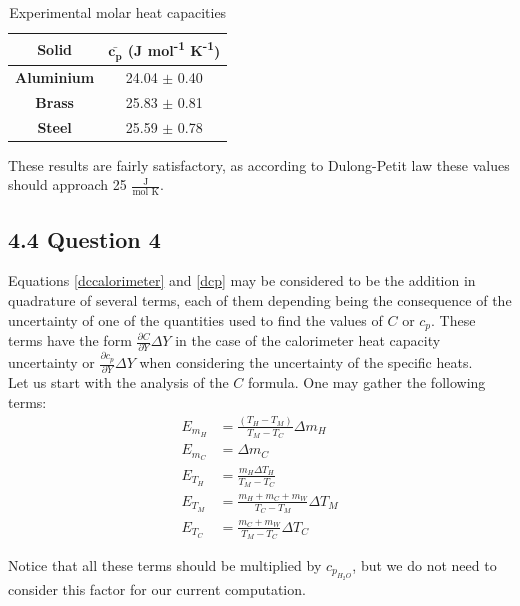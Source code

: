 \documentclass[a4paper, 12pt]{article}
\begin{document}
	\begin{table}[h!]
		\centering
			\caption{Experimental molar heat capacities}
		\begin{tabular}{|c|c|}
			\hline
			\textbf{Solid} & $\boldsymbol{\bar{c_p}}$ \textbf{(J mol\textsuperscript{-1} K\textsuperscript{-1}})\\
			\hline
			\textbf{Aluminium} & 24.04 $\pm$ 0.40 \\
			\textbf{Brass} & 25.83 $\pm$ 0.81\\
			\textbf{Steel} & 25.59 $\pm$ 0.78\\
			\hline
		\end{tabular}
	
	\end{table}

	These results are fairly satisfactory, as  according to Dulong-Petit law these values should approach 25 $\frac{\mbox{J}}{\mbox{mol K}}$. 
	\subsection{4.4 Question 4}
	Equations \ref{dccalorimeter} and \ref{dcp} may be considered to be the addition in quadrature of several terms, each of them depending being the consequence of the uncertainty of one of the quantities used to find the values of $C$ or $c_p$. These terms have the form $\frac{\partial C}{\partial Y} \Delta Y$ in the case of the calorimeter heat capacity uncertainty or $\frac{\partial c_p}{\partial Y} \Delta Y$ when considering the uncertainty of the specific heats.\\
	
	Let us start with the analysis of the $C$ formula. One may gather the following terms:\\
	\begin{align*}
		E_{m_H} &= \frac{(T_H - T_M)}{T_M - T_C}\Delta m_H \\
		E_{m_C} &= \Delta m_C \\
		E_{T_H} &= \frac{m_H \Delta T_H}{T_M - T_C} \\
		E_{T_M} &= \frac{m_H + m_C + m_W}{T_C - T_M}\Delta T_M \\
		E_{T_C} &= \frac{m_C + m_W}{T_M - T_C}\Delta T_C
	\end{align*}

	Notice that all these terms should be multiplied by $c_{p_{H_2O}}$, but we do not need to consider this factor for our current computation. \\
	
\end{document}
